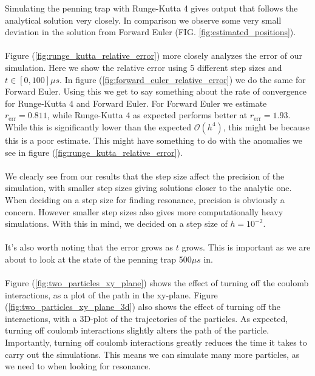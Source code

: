 Simulating the penning trap with Runge-Kutta 4 gives output that follows the analytical solution very closely. In comparison we observe some very small deviation in the solution from Forward Euler (FIG. \ref{fig:estimated_positions}). 
\\\\
Figure (\ref{fig:runge_kutta_relative_error}) more closely analyzes the error of our simulation. Here we show the relative error using 5 different step sizes and $t \in [0, 100]\mu s$. In figure (\ref{fig:forward_euler_relative_error}) we do the same for Forward Euler. Using this we get to say something about the rate of convergence for Runge-Kutta 4 and Forward Euler. For Forward Euler we estimate $r_\text{err} = 0.811$, while Runge-Kutta 4 as expected performs better at $r_\text{err} = 1.93$. While this is significantly lower than the expected $\mathcal{O}(h^4)$, this might be because this is a poor estimate. This might have something to do with the anomalies we see in figure (\ref{fig:runge_kutta_relative_error}).
\\\\
We clearly see from our results that the step size affect the precision of the simulation, with smaller step sizes giving solutions closer to the analytic one. When deciding on a step size for finding resonance, precision is obviously a concern. However smaller step sizes also gives more computationally heavy simulations. With this in mind, we decided on a step size of $h=10^{-2}$.
\\\\
It's also worth noting that the error grows as $t$ grows. This is important as we are about to look at the state of the penning trap 500$\mu s$ in.
\\\\
Figure (\ref{fig:two_particles_xy_plane}) shows the effect of turning off the coulomb interactions, as a plot of the path in the xy-plane. Figure (\ref{fig:two_particles_xy_plane_3d}) also shows the effect of turning off the interactions, with a 3D-plot of the trajectories of the particles. As expected, turning off coulomb interactions slightly alters the path of the particle. Importantly, turning off coulomb interactions greatly reduces the time it takes to carry out the simulations. This means we can simulate many more particles, as we need to when looking for resonance.
\\\\
